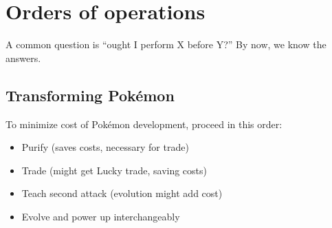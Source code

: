 \chapter{Orders of operations}
\label{chap:ooo}
A common question is ``ought I perform X before Y?''
By now, we know the answers.

\section{Transforming Pokémon}
\label{sec:pokemontransforms}
To minimize cost of Pokémon development, proceed in this order:
\begin{itemize}
\item Purify (saves costs, necessary for trade)
\item Trade (might get Lucky trade, saving costs)
\item Teach second attack (evolution might add cost)
\item Evolve and power up interchangeably
\end{itemize}

